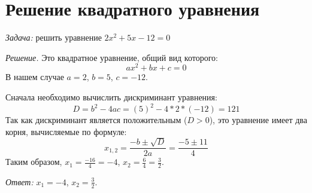 \documentclass[a4paper,12pt]{article}
\begin{document}

\section{Решение квадратного уравнения}

\textit{Задача:} решить уравнение $2x^2+5x-12=0$

\textit{Решение.} Это квадратное уравнение, общий вид которого: \[ax^2+bx+c=0\]
В нашем случае $a=2$, $b=5$, $c=-12$.

Сначала необходимо вычислить дискриминант уравнения: \[D=b^2-4ac=(5)^2-4*2*(-12)=121\]
Так как дискриминант является положительным ($D>0$), это уравнение имеет два корня, вычисляемые по формуле:
\[x_{1,2}=\frac{-b\pm\sqrt{D}}{2a}=\frac{-5\pm11}{4}\]
Таким образом, $x_1=\frac{-16}{4}=-4$, $x_2=\frac{6}{4}=\frac{3}{2}$.

\textit{Ответ:} $x_1=-4$, $x_2=\frac{3}{2}$.
\end{document}
